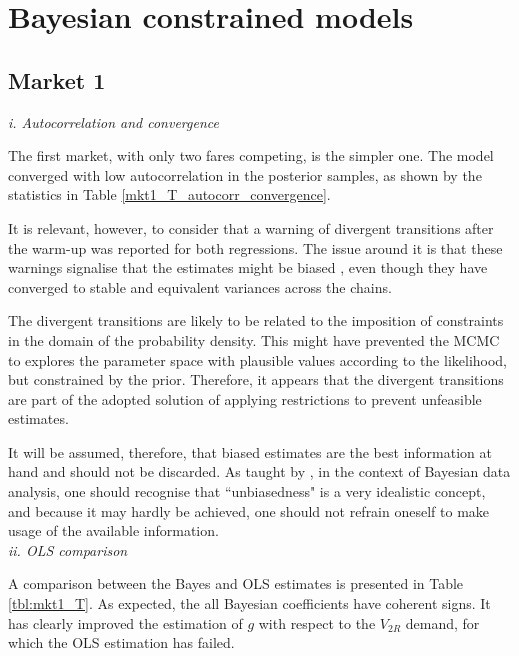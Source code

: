 \section{Bayesian constrained models}

\subsection{Market 1}

\textit{i. Autocorrelation and convergence}

The first market, with only two fares competing, is the simpler one. The model converged with low autocorrelation in the posterior samples, as shown by the statistics in Table \ref{mkt1_T_autocorr_convergence}.



It is relevant, however, to consider that a warning of divergent transitions after the warm-up was reported for both regressions. The issue around it is that these warnings signalise that the estimates might be biased \citep{stan_warnings}, even though they have converged to stable and equivalent variances across the chains.

The divergent transitions are likely to be related to the imposition of constraints in the domain of the probability density. This might have prevented the MCMC to explores the parameter space with plausible values according to the likelihood, but constrained by the prior. Therefore, it appears that the divergent transitions are part of the adopted solution of applying restrictions to prevent unfeasible estimates.

It will be assumed, therefore, that biased estimates are the best information at hand and should not be discarded. As taught by \cite{gelman_blog}, in the context of Bayesian data analysis, one should recognise that ``unbiasedness" is a very idealistic concept, and because it may hardly be achieved, one should not refrain oneself to make usage of the available information.
\\[3pt]

\textit{ii. OLS comparison}

A comparison between the Bayes and OLS estimates is presented in Table \ref{tbl:mkt1_T}. As expected, the all Bayesian coefficients have coherent signs. It has clearly improved the estimation of $g$ with respect to the $V_{2R}$ demand, for which the OLS estimation has failed.



